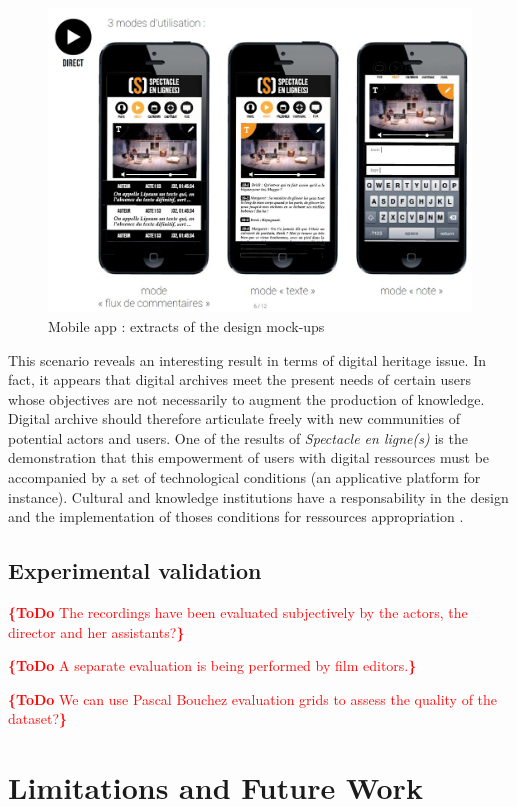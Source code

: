 \documentclass[conference]{IEEEtran}
\newcommand{\todo}[1]{\noindent\textcolor{red}{{\bf \{ToDo} #1{\bf \}}}}
\begin{document}
\begin{figure}[htb!]
  \centering
  \includegraphics[width=\columnwidth]{mobileapp}
  \caption{Mobile app : extracts of the design mock-ups}
  \label{fig:mobileapp}
\end{figure}

This scenario reveals an interesting result in terms of digital heritage issue. In fact, it appears that digital archives meet the present needs of certain users whose objectives are not necessarily to augment the production of knowledge. Digital archive should therefore articulate freely with new communities of potential actors and users. One of the results of \emph{Spectacle en ligne(s)} is the demonstration that this empowerment of users with digital ressources must be accompanied by a set of technological conditions (an applicative platform for instance). Cultural and knowledge institutions have a responsability in the design and the implementation of thoses conditions for ressources appropriation \cite{Sauret15}.

\subsection{Experimental validation}
\todo{The recordings have been evaluated subjectively by the actors, the director and her assistants?}

\todo{A separate evaluation is being performed by film editors.}

\todo{We can use Pascal Bouchez evaluation grids to assess the quality of the dataset?}


\section{Limitations and Future  Work}
\end{document}
